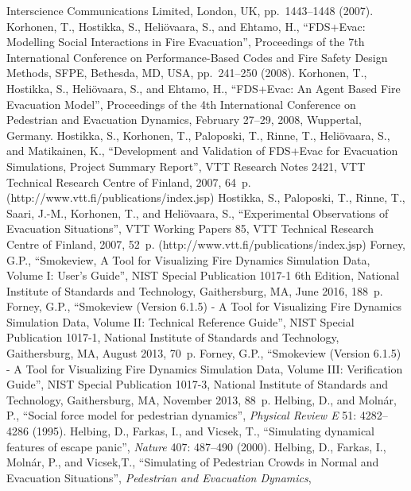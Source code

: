 \documentclass[12pt,a4paper,final,twoside]{stylevk}
\begin{document}
\begin{thebibliography}{99}
  Interscience Communications Limited, London, UK, pp.~1443--1448
  (2007).
%
 Korhonen, T., Hostikka, S., Heli\"ovaara, S.,
  and Ehtamo, H., ``FDS+Evac: Modelling Social Interactions in Fire
  Evacuation'', Proceedings of the 7th International Conference on
  Performance-Based Codes and Fire Safety Design Methods, SFPE,
  Bethesda, MD, USA, pp.~241--250 (2008).
%
 Korhonen, T., Hostikka, S., Heli\"ovaara, S.,
  and Ehtamo, H., ``FDS+Evac: An Agent Based Fire Evacuation Model'',
  Proceedings of the 4th International Conference on Pedestrian and
  Evacuation Dynamics, February 27--29, 2008, Wuppertal, Germany.
%
 Hostikka, S., Korhonen, T., Paloposki, T.,
  Rinne, T., Heli\"ovaara, S., and Matikainen, K., ``Development and
  Validation of FDS+Evac for Evacuation Simulations, Project Summary
  Report'', VTT Research Notes 2421, VTT Technical Research Centre of
  Finland, 2007, 64~p. (http://www.vtt.fi/publications/index.jsp)
%
 Hostikka, S., Paloposki, T., Rinne, T., Saari,
  J.-M., Korhonen, T., and Heli\"ovaara, S., ``Experimental
  Observations of Evacuation Situations'', VTT Working Papers 85, VTT
  Technical Research Centre of Finland, 2007, 52~p.
  (http://www.vtt.fi/publications/index.jsp)
%
 Forney, G.P., ``Smokeview, A Tool for
  Visualizing Fire Dynamics Simulation Data, Volume I: User's Guide'',
  NIST Special Publication 1017-1 6th Edition, National Institute of
  Standards and Technology, Gaithersburg, MA, June 2016, 188~p.
%
 Forney, G.P., ``Smokeview (Version 6.1.5) - A
  Tool for Visualizing Fire Dynamics Simulation Data, Volume II:
  Technical Reference Guide'', NIST Special Publication 1017-1,
  National Institute of Standards and Technology, Gaithersburg, MA,
  August 2013, 70~p.
%
 Forney, G.P., ``Smokeview (Version 6.1.5) - A
  Tool for Visualizing Fire Dynamics Simulation Data, Volume III:
  Verification Guide'', NIST Special Publication 1017-3, National
  Institute of Standards and Technology, Gaithersburg, MA, November
  2013, 88~p.
%
 Helbing, D., and Moln\'ar, P., ``Social force
  model for pedestrian dynamics'', \emph{Physical Review E} 51:
  4282--4286 (1995).
%
 Helbing, D., Farkas, I., and Vicsek, T.,
  ``Simulating dynamical features of escape panic'', \emph{Nature}
  407: 487--490 (2000).
%
 Helbing, D., Farkas, I., Moln\'ar, P., and
  Vicsek,T., ``Simulating of Pedestrian Crowds in Normal and
  Evacuation Situations'', \emph{Pedestrian and Evacuation Dynamics},

\end{thebibliography}
\end{document}
